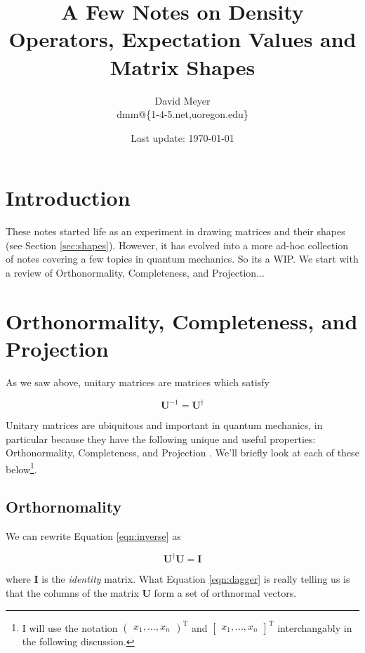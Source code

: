 \documentclass[11pt, oneside]{article}   	%
\title{A Few Notes on Density Operators, Expectation Values and Matrix Shapes}
\author{David Meyer \\ dmm@\{1-4-5.net,uoregon.edu\}}
\date{Last update: \today}							%
\begin{document}
\maketitle

\section{Introduction}
These notes started life as an experiment in drawing matrices and their shapes (see Section \ref{sec:shapes}). However, it has evolved into a more ad-hoc collection of notes
covering a few topics in quantum mechanics. So its a WIP. We start with a review of Orthonormality, Completeness, and Projection...


\section{Orthonormality, Completeness, and Projection}
As we saw above, unitary matrices are matrices which satisfy 

\begin{equation}
\mathbf{U}^{-1} = \mathbf{U}^{\dagger}
\label{eqn:inverse}
\end{equation}

\bigskip
\noindent
Unitary matrices are ubiquitous and important in quantum mechanics, in 
particular because they have the following unique and useful properties: Orthonormality, Completeness, and Projection \cite{cresser2007}. 
We'll briefly look at each of these below\footnote{I will use the 
notation $\begin{pmatrix} x_1, \hdots, x_n \end{pmatrix}^{\text{T}}$ and $\begin{bmatrix} x_1, \hdots, x_n \end{bmatrix}^\text{T}$ interchangably in the following discussion.}.

\subsection{Orthornomality}
We can rewrite Equation \ref{eqn:inverse} as

\begin{equation}
\mathbf{U}^{\dagger} \mathbf{U} = \mathbf{I}
\label{eqn:dagger}
\end{equation}

\bigskip
\noindent
where \textbf{I} is the \emph{identity} matrix. What Equation \ref{eqn:dagger} is really telling us is that the columns of the matrix \textbf{U} form a set of orthnormal vectors.
\end{document}
